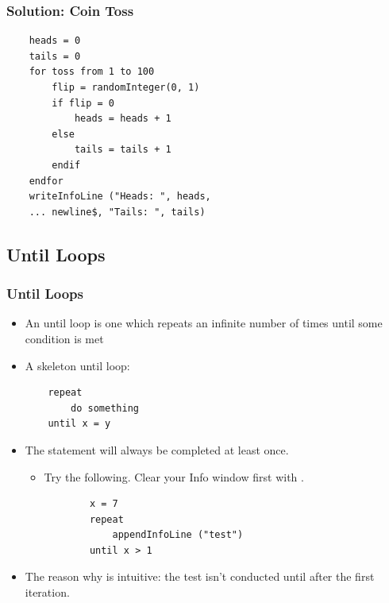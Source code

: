 \documentclass[handout]{beamer}
\begin{document}
\begin{frame}[fragile]
\frametitle{Solution: Coin Toss}
\begin{verbatim}
    heads = 0
    tails = 0
    for toss from 1 to 100
        flip = randomInteger(0, 1)
        if flip = 0
            heads = heads + 1
        else
            tails = tails + 1
        endif
    endfor
    writeInfoLine ("Heads: ", heads,
    ... newline$, "Tails: ", tails)
\end{verbatim}

\end{frame}

\subsection{Until Loops}

\begin{frame}[fragile]
\frametitle{Until Loops}

\begin{itemize}
    \item <1-> An until loop is one which repeats an infinite number of times until some condition is met

    \item <1-> A skeleton until loop:
    \begin{verbatim}
    repeat
        do something
    until x = y
    \end{verbatim}

    \item <2-> The statement will always be completed at least once.
    \begin{itemize}
        \item Try the following. Clear your Info window first with .
        \begin{verbatim}
        x = 7
        repeat
            appendInfoLine ("test")
        until x > 1
    \end{verbatim}
    \end{itemize}

    \item <3-> The reason why is intuitive: the test isn't conducted until after the first iteration.

\end{itemize}  
\end{frame}
\end{document}
